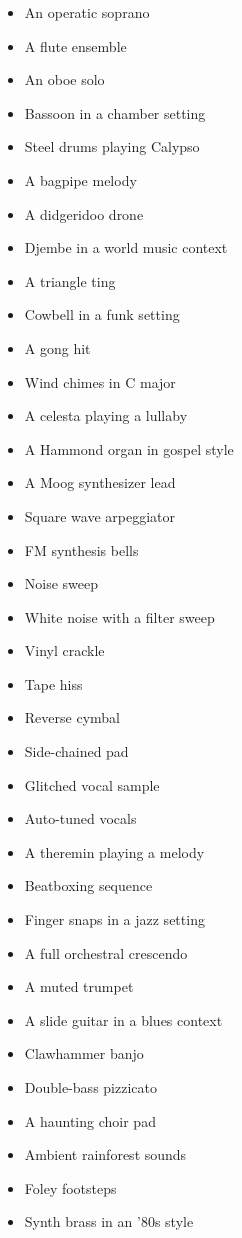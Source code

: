 \documentclass[
  a4paper,  %
  twoside,  %
  bibliography=totoc,
  headsepline,
  cleardoublepage=empty,
  parskip=half,
  draft=false
]{scrbook}
\begin{document}
\begin{multicols}{4}
\begin{itemize}
    \item An operatic soprano
    \item A flute ensemble
    \item An oboe solo
    \item Bassoon in a chamber setting
    \item Steel drums playing Calypso
    \item A bagpipe melody
    \item A didgeridoo drone
    \item Djembe in a world music context
    \item A triangle ting
    \item Cowbell in a funk setting
    \item A gong hit
    \item Wind chimes in C major
    \item A celesta playing a lullaby
    \item A Hammond organ in gospel style
    \item A Moog synthesizer lead
    \item Square wave arpeggiator
    \item FM synthesis bells
    \item Noise sweep
    \item White noise with a filter sweep
    \item Vinyl crackle
    \item Tape hiss
    \item Reverse cymbal
    \item Side-chained pad
    \item Glitched vocal sample
    \item Auto-tuned vocals
    \item A theremin playing a melody
    \item Beatboxing sequence
    \item Finger snaps in a jazz setting
    \item A full orchestral crescendo
    \item A muted trumpet
    \item A slide guitar in a blues context
    \item Clawhammer banjo
    \item Double-bass pizzicato
    \item A haunting choir pad
    \item Ambient rainforest sounds
    \item Foley footsteps
    \item Synth brass in an '80s style

\end{itemize}
\end{multicols}
\end{document}
